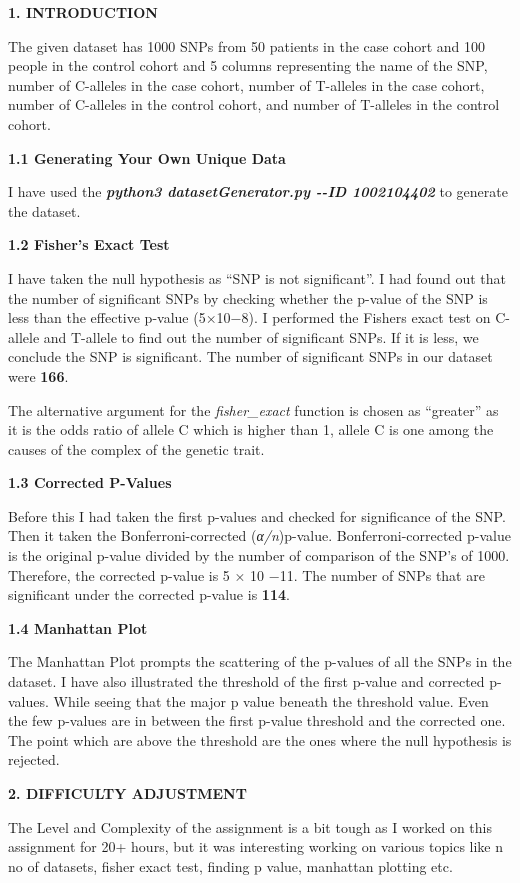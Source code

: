 \documentclass[
]{article}
\author{}
\date{}
\begin{document}
\textbf{1. INTRODUCTION}

The given dataset has 1000 SNPs from 50 patients in the case cohort and
100 people in the control cohort and 5 columns representing the name of
the SNP, number of C-alleles in the case cohort, number of T-alleles in
the case cohort, number of C-alleles in the control cohort, and number
of T-alleles in the control cohort.

\textbf{1.1 Generating Your Own Unique Data}

I have used the \emph{\textbf{python3 datasetGenerator.py -\/-ID
1002104402}} to generate the dataset.

\textbf{1.2 Fisher's Exact Test}

I have taken the null hypothesis as ``SNP is not significant''. I had
found out that the number of significant SNPs by checking whether the
p-value of the SNP is less than the effective p-value (5×10−8). I
performed the Fisher\textquotesingle s exact test on C-allele and
T-allele to find out the number of significant SNPs. If it is less, we
conclude the SNP is significant. The number of significant SNPs in our
dataset were \textbf{166}.

The alternative argument for the \emph{fisher\_exact} function is chosen
as ``greater'' as it is the odds ratio of allele C which is higher than
1, allele C is one among the causes of the complex of the genetic trait.

\textbf{1.3 Corrected P-Values}

Before this I had taken the first p-values and checked for significance
of the SNP. Then it taken the Bonferroni-corrected (\emph{α/n})p-value.
Bonferroni-corrected p-value is the original p-value divided by the
number of comparison of the SNP's of 1000. Therefore, the corrected
p-value is 5 × 10 −11. The number of SNPs that are significant under the
corrected p-value is \textbf{114}.

\textbf{1.4 Manhattan Plot}

The Manhattan Plot prompts the scattering of the p-values of all the
SNPs in the dataset. I have also illustrated the threshold of the first
p-value and corrected p-values. While seeing that the major p value
beneath the threshold value. Even the few p-values are in between the
first p-value threshold and the corrected one. The point which are above
the threshold are the ones where the null hypothesis is rejected.

\textbf{2. DIFFICULTY ADJUSTMENT}


The Level and Complexity of the assignment is a bit tough as I worked on
this assignment for 20+ hours, but it was interesting working on various
topics like n no of datasets, fisher exact test, finding p value,
manhattan plotting etc.
\end{document}
